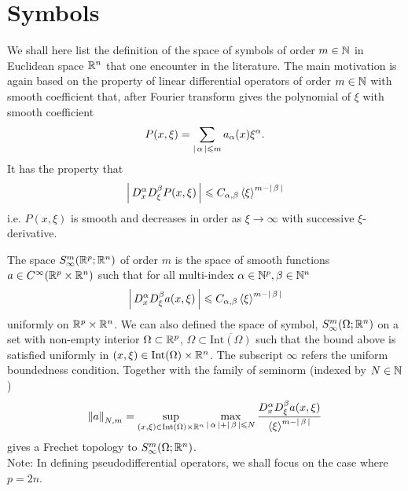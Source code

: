 \documentclass[12pt]{article}
\begin{document}
\section{Symbols}
We shall here list the definition of the space of symbols of order $m \in \N$  in Euclidean space $\R^n$ that one encounter in the literature. The main motivation is again based on the property of linear differential operators of order $m \in \N$ with smooth coefficient that, after Fourier transform gives the polynomial of $\xi$ with smooth coefficient 
\begin{align*}
P(x, \xi) = \sum_{\abs{\alpha} \leq m} a_\alpha(x) \xi^\alpha. 
\end{align*}
It has the property that 
\begin{align*}
\abs{D^\alpha_x D^\beta_\xi P(x, \xi)} \leq C_{\alpha, \beta} \sym[\xi]^{m - \abs{\beta}} 
\end{align*}
i.e. $P(x, \xi)$ is smooth and decreases in order as $\xi \to \infty$ with successive $\xi$-derivative. 


\begin{fdefinition}
    The space $S^m_\infty(\R^p; \R^n)$ of order $m$ is the space of smooth functions $a \in C^\infty(\R^p \times \R^n)$ such that for all multi-index $\alpha \in \N^p, \beta \in \N^n$
    \begin{align*}
    \abs{D^\alpha_x D^\beta_\xi a (x, \xi)} \leq C_{\alpha, \beta} \sym[\xi]^{m - \abs{\beta}} 
    \end{align*}
    uniformly on $\R^p \times \R^n$. We can also defined the space of symbol, $S^m_\infty(\Omega; \R^n)$ on a set with non-empty interior $\Omega \subset \R^p$, $\Omega \subset \overline{\mathrm{Int}(\Omega)}$ such that the bound above is satisfied uniformly in $(x, \xi) \in \mathrm{Int}(\Omega) \times \R^n$. The subscript $\infty$ refers the uniform boundedness condition. Together with the family of seminorm (indexed by $N \in \N$) 
    \begin{align*}
    \norm[a]_{N, m} = \sup_{(x, \xi) \in \mathrm{Int}(\Omega) \times \R^n} \max_{\abs{\alpha} + \abs{\beta} \leq N} \frac{D^\alpha_x D^\beta_\xi a(x, \xi)}{\sym[\xi]^{m - \abs{\beta}}} 
    \end{align*}
    gives a Frechet topology to $S^m_\infty(\Omega; \R^n)$. \\
    
    Note: In defining pseudodifferential operators, we shall focus on the case where $p = 2n$.
\end{fdefinition}
\end{document}
